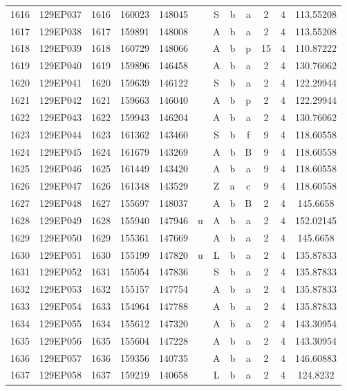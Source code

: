 \begin{tabular}{|*{12}{c|}}
1616 & 129EP037 & 1616 & 160023 & 148045 &  & S & b & a & 2 & 4 & 113.55208 \\ 
1617 & 129EP038 & 1617 & 159891 & 148008 &  & A & b & a & 2 & 4 & 113.55208 \\ 
1618 & 129EP039 & 1618 & 160729 & 148066 &  & A & b & p & 15 & 4 & 110.87222 \\ 
1619 & 129EP040 & 1619 & 159896 & 146458 &  & A & b & a & 2 & 4 & 130.76062 \\ 
1620 & 129EP041 & 1620 & 159639 & 146122 &  & S & b & a & 2 & 4 & 122.29944 \\ 
1621 & 129EP042 & 1621 & 159663 & 146040 &  & A & b & p & 2 & 4 & 122.29944 \\ 
1622 & 129EP043 & 1622 & 159943 & 146204 &  & A & b & a & 2 & 4 & 130.76062 \\ 
1623 & 129EP044 & 1623 & 161362 & 143460 &  & S & b & f & 9 & 4 & 118.60558 \\ 
1624 & 129EP045 & 1624 & 161679 & 143269 &  & A & b & B & 9 & 4 & 118.60558 \\ 
1625 & 129EP046 & 1625 & 161449 & 143420 &  & A & b & a & 9 & 4 & 118.60558 \\ 
1626 & 129EP047 & 1626 & 161348 & 143529 &  & Z & a & c & 9 & 4 & 118.60558 \\ 
1627 & 129EP048 & 1627 & 155697 & 148037 &  & A & b & B & 2 & 4 & 145.6658 \\ 
1628 & 129EP049 & 1628 & 155940 & 147946 & u & A & b & a & 2 & 4 & 152.02145 \\ 
1629 & 129EP050 & 1629 & 155361 & 147669 &  & A & b & a & 2 & 4 & 145.6658 \\ 
1630 & 129EP051 & 1630 & 155199 & 147820 & u & L & b & a & 2 & 4 & 135.87833 \\ 
1631 & 129EP052 & 1631 & 155054 & 147836 &  & S & b & a & 2 & 4 & 135.87833 \\ 
1632 & 129EP053 & 1632 & 155157 & 147754 &  & A & b & a & 2 & 4 & 135.87833 \\ 
1633 & 129EP054 & 1633 & 154964 & 147788 &  & A & b & a & 2 & 4 & 135.87833 \\ 
1634 & 129EP055 & 1634 & 155612 & 147320 &  & A & b & a & 2 & 4 & 143.30954 \\ 
1635 & 129EP056 & 1635 & 155604 & 147228 &  & A & b & a & 2 & 4 & 143.30954 \\ 
1636 & 129EP057 & 1636 & 159356 & 140735 &  & A & b & a & 2 & 4 & 146.60883 \\ 
1637 & 129EP058 & 1637 & 159219 & 140658 &  & L & b & a & 2 & 4 & 124.8232 \\ 

\end{tabular}
